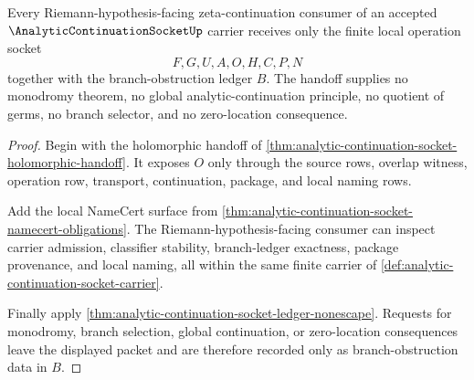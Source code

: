 \begin{theorem}
\label{thm:analytic-continuation-socket-rh-handoff-boundary}
Every Riemann-hypothesis-facing zeta-continuation consumer of an accepted $\AnalyticContinuationSocketUp$ carrier receives only the finite local operation socket
$$
F,G,U,A,O,H,C,P,N
$$
together with the branch-obstruction ledger $B$. The handoff supplies no monodromy theorem, no global analytic-continuation principle, no quotient of germs, no branch selector, and no zero-location consequence.
\end{theorem}
\begin{proof}
Begin with the holomorphic handoff of \autoref{thm:analytic-continuation-socket-holomorphic-handoff}. It exposes $O$ only through the source rows, overlap witness, operation row, transport, continuation, package, and local naming rows.

Add the local NameCert surface from \autoref{thm:analytic-continuation-socket-namecert-obligations}. The Riemann-hypothesis-facing consumer can inspect carrier admission, classifier stability, branch-ledger exactness, package provenance, and local naming, all within the same finite carrier of \autoref{def:analytic-continuation-socket-carrier}.

Finally apply \autoref{thm:analytic-continuation-socket-ledger-nonescape}. Requests for monodromy, branch selection, global continuation, or zero-location consequences leave the displayed packet and are therefore recorded only as branch-obstruction data in $B$.
\end{proof}

